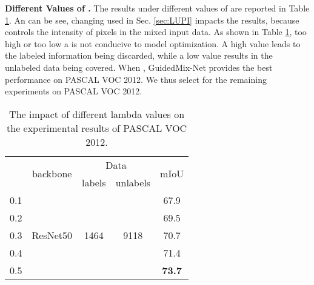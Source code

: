 \textbf{Different Values of .}
The results under different values of  are reported in Table \ref{impact_lambda}. 
An can be see, changing  used in Sec. \ref{sec:LUPI} impacts the results, because  controls the intensity of pixels in the mixed input data.
As shown in Table \ref{impact_lambda}, too high or too low a  is not conducive to model optimization.
A high  value leads to the labeled information being discarded, while a low  value results in the unlabeled data being covered.
When , GuidedMix-Net provides the best performance on PASCAL VOC 2012.
We thus select  for the remaining experiments on PASCAL VOC 2012.
\begin{table}[h]
\small
\centering
\caption{The impact of different lambda values on the experimental results of PASCAL VOC 2012.}
\begin{tabular}{c|c|c|c|c}
\hline 
\multirow{2}{*}{} & \multirow{2}{*}{backbone} & \multicolumn{2}{c|}{Data} & \multirow{2}{*}{mIoU} \\\cline{3-4}
                        &      &  labels   & unlabels        &                       \\\hline
 0.1 & \multirow{5}{*}{ResNet50} &  \multirow{5}{*}{1464} & \multirow{5}{*}{9118}   & 67.9 \\
 0.2 &  &  &      & 69.5 \\
 0.3 &  &  &      & 70.7 \\
 0.4 &  &  &      & 71.4 \\
 0.5 &  &  &      & \textbf{73.7} \\\hline
\end{tabular}
\label{impact_lambda}
\end{table}


